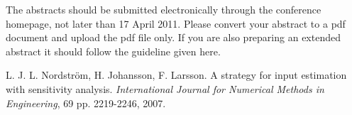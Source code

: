 \documentclass{article}
\begin{document}
The abstracts should be submitted electronically through the conference homepage, not later than 17 April 2011. Please convert your abstract to a pdf document and upload the pdf file only.
If you are also preparing an extended abstract it should follow the guideline given here.
\begin{thebibliography}{00}
\normalsize
   L. J. L. Nordström, H. Johansson, F. Larsson. A strategy for input estimation
   with sensitivity analysis. \emph{International Journal for Numerical Methods in Engineering}, 69 pp. 2219-2246, 2007.
\end{thebibliography}
\end{document}
